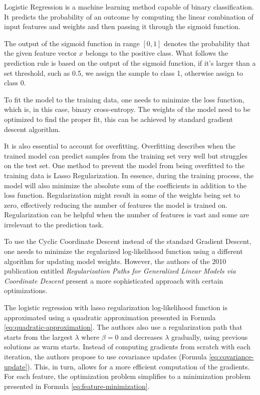 \documentclass[11pt]{article}
\begin{document}

Logistic Regression is a machine learning method capable of binary classification. It predicts the probability of an outcome by computing the linear combination of input features and weights and then passing it through the sigmoid function.

The output of the sigmoid function in range $[0,1]$ denotes the probability that the given feature vector $x$ belongs to the positive class. What follows the prediction rule is based on the output of the sigmoid function, if it's larger than a set threshold, such as 0.5, we assign the sample to class 1, otherwise assign to class 0.

To fit the model to the training data, one needs to minimize the loss function, which is, in this case, binary cross-entropy. The weights of the model need to be optimized to find the proper fit, this can be achieved by standard gradient descent algorithm.

It is also essential to account for overfitting. Overfitting describes when the trained model can predict samples from the training set very well but struggles on the test set. One method to prevent the model from being overfitted to the training data is Lasso Regularization. In essence, during the training process, the model will also minimize the absolute sum of the coefficients in addition to the loss function. Regularization might result in some of the weights being set to zero, effectively reducing the number of features the model is trained on. Regularization can be helpful when the number of features is vast and some are irrelevant to the prediction task.

To use the Cyclic Coordinate Descent instead of the standard Gradient Descent, one needs to minimize the regularized log-likelihood function using a different algorithm for updating model weights. However, the authors of the 2010 publication entitled \textit{Regularization Paths for Generalized Linear Models via Coordinate Descent} \cite{Friedman2010} present a more sophisticated approach with certain optimizations.


The logistic regression with lasso regularization log-likelihood function is approximated using a quadratic approximation presented in Formula \ref{eq:quadratic-approximation}. The authors also use a regularization path that starts from the largest $\lambda$ where $\beta = 0$ and decreases $\lambda$ gradually, using previous solutions as warm starts. Instead of computing gradients from scratch with each iteration, the authors propose to use covariance updates (Formula \ref{eq:covariance-update}). This, in turn, allows for a more efficient computation of the gradients. For each feature, the optimization problem simplifies to a minimization problem presented in Formula \ref{eq:feature-minimization}.
\end{document}
